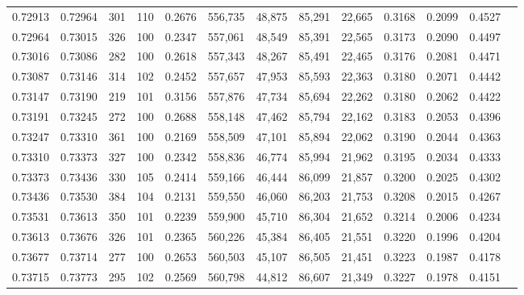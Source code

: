 \begin{tabular}{rrrrrrrrrrrrr}
0.72913 & 0.72964 &   301 & 110 &                                     0.2676 & 556,735 &  48,875 &  85,291 &  22,665 & 0.3168 & 0.2099 & 0.4527 \\
0.72964 & 0.73015 &   326 & 100 &                                     0.2347 & 557,061 &  48,549 &  85,391 &  22,565 & 0.3173 & 0.2090 & 0.4497 \\
0.73016 & 0.73086 &   282 & 100 &                                     0.2618 & 557,343 &  48,267 &  85,491 &  22,465 & 0.3176 & 0.2081 & 0.4471 \\
0.73087 & 0.73146 &   314 & 102 &                                     0.2452 & 557,657 &  47,953 &  85,593 &  22,363 & 0.3180 & 0.2071 & 0.4442 \\
0.73147 & 0.73190 &   219 & 101 &                                     0.3156 & 557,876 &  47,734 &  85,694 &  22,262 & 0.3180 & 0.2062 & 0.4422 \\
0.73191 & 0.73245 &   272 & 100 &                                     0.2688 & 558,148 &  47,462 &  85,794 &  22,162 & 0.3183 & 0.2053 & 0.4396 \\
0.73247 & 0.73310 &   361 & 100 &                                     0.2169 & 558,509 &  47,101 &  85,894 &  22,062 & 0.3190 & 0.2044 & 0.4363 \\
0.73310 & 0.73373 &   327 & 100 &                                     0.2342 & 558,836 &  46,774 &  85,994 &  21,962 & 0.3195 & 0.2034 & 0.4333 \\
0.73373 & 0.73436 &   330 & 105 &                                     0.2414 & 559,166 &  46,444 &  86,099 &  21,857 & 0.3200 & 0.2025 & 0.4302 \\
0.73436 & 0.73530 &   384 & 104 &                                     0.2131 & 559,550 &  46,060 &  86,203 &  21,753 & 0.3208 & 0.2015 & 0.4267 \\
0.73531 & 0.73613 &   350 & 101 &                                     0.2239 & 559,900 &  45,710 &  86,304 &  21,652 & 0.3214 & 0.2006 & 0.4234 \\
0.73613 & 0.73676 &   326 & 101 &                                     0.2365 & 560,226 &  45,384 &  86,405 &  21,551 & 0.3220 & 0.1996 & 0.4204 \\
0.73677 & 0.73714 &   277 & 100 &                                     0.2653 & 560,503 &  45,107 &  86,505 &  21,451 & 0.3223 & 0.1987 & 0.4178 \\
0.73715 & 0.73773 &   295 & 102 &                                     0.2569 & 560,798 &  44,812 &  86,607 &  21,349 & 0.3227 & 0.1978 & 0.4151 \\

\end{tabular}
